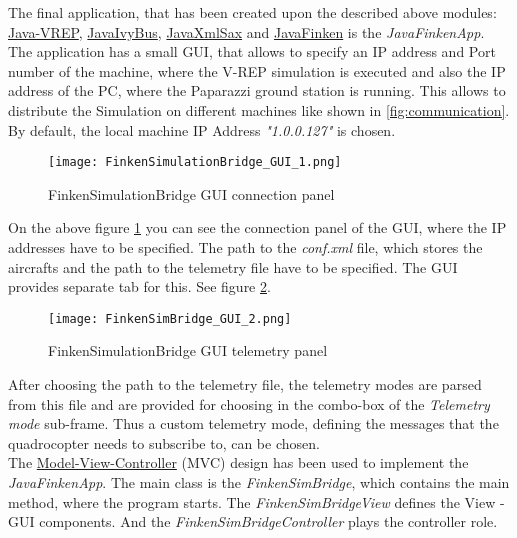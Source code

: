 The final application, that has been created upon the described above modules: \hyperref[sec:vrepImplementation]{Java-VREP}, \hyperref[sec:ivyBusImplementation]{JavaIvyBus}, \hyperref[sec:xmlImplementation]{JavaXmlSax} and \hyperref[sec:javaFinkenImplementation]{JavaFinken}  is the \textit{JavaFinkenApp}. 
The application has a small \gls{GUI}, that allows to specify an IP address and Port number of the machine, where the V-REP simulation is executed and also the IP address of the PC, where the Paparazzi ground station is running. 
This allows to distribute the Simulation on different machines like shown in \ref{fig:communication}.
By default, the local machine IP Address \textit{"1.0.0.127"} is chosen. 

\begin{figure}[h!]
 \begin{center}
  \texttt{[image: FinkenSimulationBridge\_GUI\_1.png]}
 \end{center}
  \caption{FinkenSimulationBridge \gls{GUI} connection panel\label{fig:finkenGUI1}}
\end{figure}

On the above figure \ref{fig:finkenGUI1} you can see the connection panel of the \gls{GUI}, where the IP addresses have to be specified. The path to the \textit{conf.xml} file, which stores the aircrafts and the path to the telemetry file have to be specified. The \gls{GUI} provides separate tab for this. See figure \ref{fig:finkenGUI2}.

\begin{figure}[h!]
 \begin{center}
  \texttt{[image: FinkenSimBridge\_GUI\_2.png]}
 \end{center}
  \caption{FinkenSimulationBridge \gls{GUI} telemetry panel\label{fig:finkenGUI2}}
\end{figure}

After choosing the path to the telemetry file, the telemetry modes are parsed from this file and are  provided for choosing in the combo-box of the \textit{Telemetry mode} sub-frame. Thus a custom telemetry mode, defining the messages that the quadrocopter needs to subscribe to, can be chosen. \\

The \href{http://www.oracle.com/technetwork/articles/javase/index-142890.html}{Model-View-Controller} (MVC) design has been used to implement the \textit{JavaFinkenApp}. The main class is the \textit{FinkenSimBridge}, which contains the main method, where the program starts. The \textit{FinkenSimBridgeView} defines the View - \gls{GUI} components. And the \textit{FinkenSimBridgeController} plays the controller role. \\


